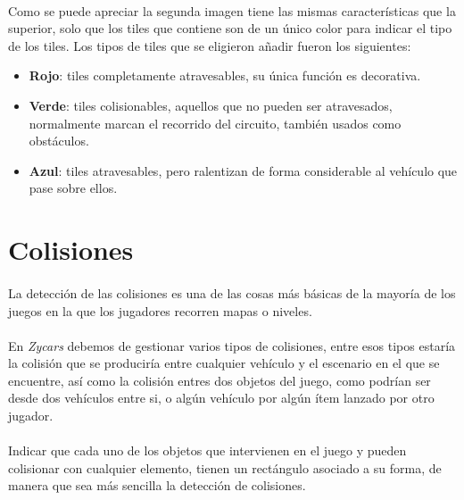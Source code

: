 \paragraph{}
Como se puede apreciar la segunda imagen tiene las mismas características que la superior, solo que los tiles que contiene
son de un único color para indicar el tipo de los tiles. Los tipos de tiles que se eligieron añadir fueron los siguientes:

\begin{itemize}
    \item \textbf{Rojo}: tiles completamente atravesables, su única función es decorativa.
    
    \item \textbf{Verde}: tiles colisionables, aquellos que no pueden ser atravesados, normalmente marcan el recorrido
    del circuito, también usados como obstáculos.
    
    \item \textbf{Azul}: tiles atravesables, pero ralentizan de forma considerable al vehículo que pase sobre ellos.
\end{itemize}

\section{Colisiones}

\paragraph{}
La detección de las colisiones es una de las cosas más básicas de la mayoría de los juegos en la que los jugadores
recorren mapas o niveles.

\paragraph{}
En \emph{Zycars} debemos de gestionar varios tipos de colisiones, entre esos tipos estaría la colisión que se produciría 
entre cualquier vehículo y el escenario en el que se encuentre, así como la colisión entres dos objetos del juego, como podrían
ser desde dos vehículos entre si, o algún vehículo por algún ítem lanzado por otro jugador.

\paragraph{}
Indicar que cada uno de los objetos que intervienen en el juego y pueden colisionar con cualquier elemento, tienen
un rectángulo asociado a su forma, de manera que sea más sencilla la detección de colisiones.

